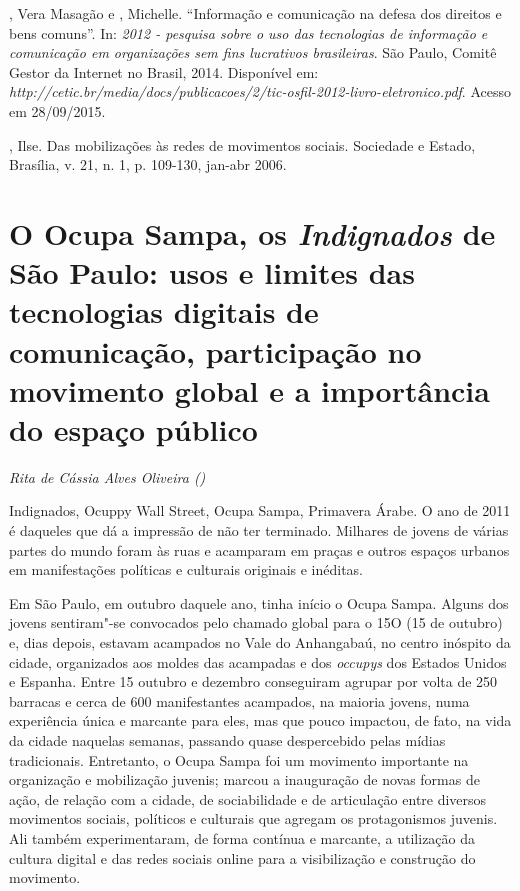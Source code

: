 \begin{Parskip}
, Vera Masagão e , Michelle. ``Informação e comunicação
na defesa dos direitos e bens comuns''. In: \emph{ 2012 - pesquisa sobre o uso das tecnologias de
informação e comunicação em organizações sem fins lucrativos
brasileiras}. São Paulo, Comitê Gestor da Internet no Brasil, 2014.
Disponível em:
\emph{http://cetic.br/media/docs/publicacoes/2/tic-osfil-2012-livro-eletronico.pdf}.
Acesso em 28/09/2015.

, Ilse. Das mobilizações às redes de movimentos sociais.
Sociedade e Estado, Brasília, v. 21, n. 1, p. 109-130, jan-abr 2006.
\end{Parskip}

\chapter*{O Ocupa Sampa, os \emph{Indignados} de São Paulo: usos e limites
das tecnologias digitais de comunicação, participação no movimento
global e a importância do espaço público}

\begin{flushright}
\emph{Rita de Cássia Alves Oliveira ()}
\end{flushright}

Indignados, Ocuppy Wall Street, Ocupa Sampa, Primavera Árabe. O ano de
2011 é daqueles que dá a impressão de não ter terminado. Milhares de
jovens de várias partes do mundo foram às ruas e acamparam em praças e
outros espaços urbanos em manifestações políticas e culturais originais
e inéditas.

Em São Paulo, em outubro daquele ano, tinha início o Ocupa Sampa. Alguns
dos jovens sentiram"-se convocados pelo chamado global para o 15O (15 de
outubro) e, dias depois, estavam acampados no Vale do Anhangabaú, no
centro inóspito da cidade, organizados aos moldes das acampadas e dos
\emph{occupys} dos Estados Unidos e Espanha. Entre 15 outubro e dezembro
conseguiram agrupar por volta de 250 barracas e cerca de 600
manifestantes acampados, na maioria jovens, numa experiência única e
marcante para eles, mas que pouco impactou, de fato, na vida da cidade
naquelas semanas, passando quase despercebido pelas mídias tradicionais.
Entretanto, o Ocupa Sampa foi um movimento importante na organização e
mobilização juvenis; marcou a inauguração de novas formas de ação, de
relação com a cidade, de sociabilidade e de articulação entre diversos
movimentos sociais, políticos e culturais que agregam os protagonismos
juvenis. Ali também experimentaram, de forma contínua e marcante, a
utilização da cultura digital e das redes sociais online para a
visibilização e construção do movimento.


